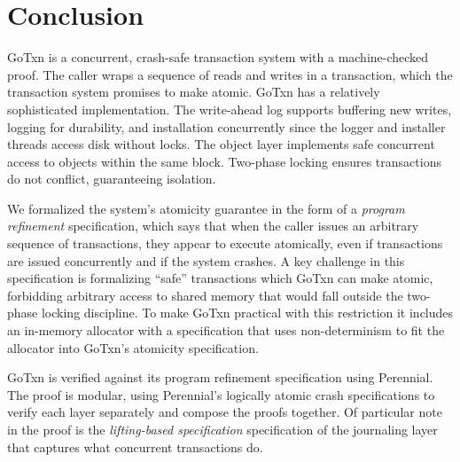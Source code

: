 \section{Conclusion}
\label{sec:txn:concl}

GoTxn is a concurrent, crash-safe transaction system with a machine-checked
proof. The caller wraps a sequence of reads and writes in a transaction, which
the transaction system promises to make atomic. GoTxn has a relatively
sophisticated implementation. The write-ahead log supports buffering new writes,
logging for durability, and installation concurrently since the logger and
installer threads access disk without locks. The object layer implements
safe concurrent access to objects within the same block. Two-phase locking
ensures transactions do not conflict, guaranteeing isolation.

We formalized the system's atomicity guarantee in the form of a \emph{program
refinement} specification, which says that when the caller issues an arbitrary
sequence of transactions, they appear to execute atomically, even if
transactions are issued concurrently and if the system crashes. A key challenge
in this specification is formalizing ``safe'' transactions which GoTxn can make
atomic, forbidding arbitrary access to shared memory that would fall outside the
two-phase locking discipline. To make GoTxn practical with this restriction it
includes an in-memory allocator with a specification that uses non-determinism
to fit the allocator into GoTxn's atomicity specification.

GoTxn is verified against its program refinement specification using Perennial.
The proof is modular, using Perennial's logically atomic crash specifications to
verify each layer separately and compose the proofs together. Of particular note
in the proof is the \emph{lifting-based specification} specification of the
journaling layer that captures what concurrent transactions do.
